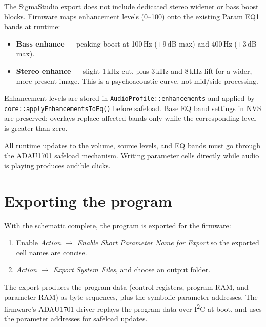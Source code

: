 The SigmaStudio export does not include dedicated stereo widener or bass
boost blocks. Firmware maps enhancement levels (0--100) onto the
existing Param EQ1 bands at runtime:

\begin{itemize}
  \item \textbf{Bass enhance} --- peaking boost at 100\,Hz (+9\,dB max)
        and 400\,Hz (+3\,dB max).
  \item \textbf{Stereo enhance} --- slight 1\,kHz cut, plus 3\,kHz and
        8\,kHz lift for a wider, more present image. This is a
        psychoacoustic curve, not mid/side processing.
\end{itemize}

Enhancement levels are stored in \texttt{AudioProfile::enhancements} and
applied by \texttt{core::applyEnhancementsToEq()} before safeload. Base EQ
band settings in NVS are preserved; overlays replace affected bands only
while the corresponding level is greater than zero.

\begin{drcaution}
All runtime updates to the volume, source levels, and EQ bands must go
through the ADAU1701 safeload mechanism. Writing parameter cells directly
while audio is playing produces audible clicks.
\end{drcaution}

\section{Exporting the program}
\label{sec:ss-export}

With the schematic complete, the program is exported for the firmware:

\begin{enumerate}
  \item Enable \emph{Action \(\rightarrow\) Enable Short Parameter Name
        for Export} so the exported cell names are concise.
  \item \emph{Action \(\rightarrow\) Export System Files}, and choose an
        output folder.
\end{enumerate}

The export produces the program data (control registers, program RAM, and
parameter RAM) as byte sequences, plus the symbolic parameter addresses.
The firmware's ADAU1701 driver replays the program data over
I\textsuperscript{2}C at boot, and uses the parameter addresses for
safeload updates.

